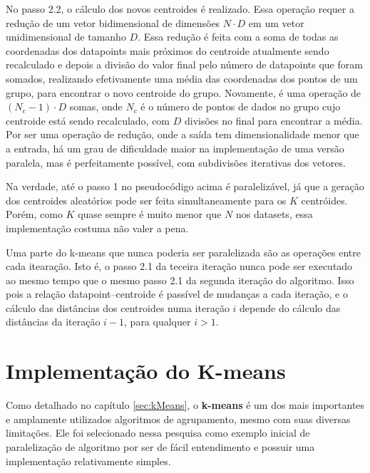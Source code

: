 \documentclass[12pt,
openright, 
oneside, %
a4paper,    %
brazil]{facom-ufu-abntex2}
\begin{document}
No passo 2.2, o cálculo dos novos centroides é realizado. Essa operação requer a redução de um vetor bidimensional de dimensões $N \cdot D$ em um vetor unidimensional de tamanho $D$. Essa redução é feita com a soma de todas as coordenadas dos datapoints mais próximos do centroide atualmente sendo recalculado e depois a divisão do valor final pelo número de datapoints que foram somados, realizando efetivamente uma média das coordenadas dos pontos de um grupo, para encontrar o novo centroide do grupo. Novamente, é uma operação de $(N_c - 1) \cdot D$ somas, onde $N_c$ é o número de pontos de dados no grupo cujo centroide está sendo recalculado, com $D$ divisões no final para encontrar a média. Por ser uma operação de redução, onde a saída tem dimensionalidade menor que a entrada, há um grau de dificuldade maior na implementação de uma versão paralela, mas é perfeitamente possível, com subdivisões iterativas dos vetores.

Na verdade, até o passo 1 no pseudocódigo acima é paralelizável, já que a geração dos centroides aleatórios pode ser feita simultaneamente para os $K$ centróides. Porém, como $K$ quase sempre é muito menor que $N$ nos datasets, essa implementação costuma não valer a pena.

Uma parte do k-means que nunca poderia ser paralelizada são as operações entre cada itearação. Isto é, o passo 2.1 da teceira iteração nunca pode ser executado ao mesmo tempo que o mesmo passo 2.1 da segunda iteração do algoritmo. Isso pois a relação datapoint--centroide é passível de mudanças a cada iteração, e o cálculo das distâncias dos centroides numa iteração $i$ depende do cálculo das distâncias da iteração $i-1$, para qualquer $i > 1$.





\section{Implementação do K-means}
\label{sec:kMeansImplementações}

Como detalhado no capítulo \ref{sec:kMeans}, o \textbf{k-means} é um dos mais importantes e amplamente utilizados algoritmos de agrupamento, mesmo com suas diversas limitações. Ele foi selecionado nessa pesquisa como exemplo inicial de paralelização de algoritmo por ser de fácil entendimento e possuir uma implementação relativamente simples.
\end{document}
